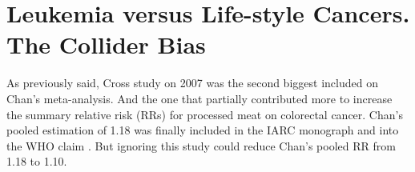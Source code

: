\documentclass{article}
\begin{document}












\section{Leukemia versus Life-style Cancers. The Collider Bias}
\label{sec:cross}
As previously said, Cross study on 2007 \cite{cross} was the second biggest included on Chan's meta-analysis. And the one that partially contributed more to increase the summary relative risk (RRs) for processed meat on colorectal cancer. Chan's pooled estimation of 1.18 was finally included in the IARC monograph \cite{monograph} and into the WHO claim \cite{whoint}. But ignoring this study could reduce Chan's pooled RR from 1.18 to 1.10.
\end{document}
